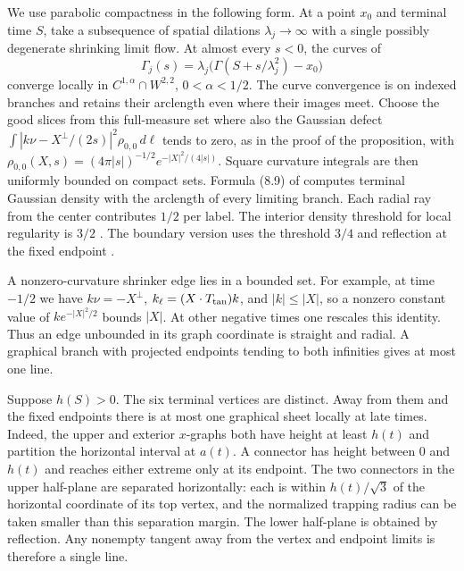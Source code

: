 We use parabolic compactness \cite[Definition~8.4 and
Proposition~8.17]{survey} in the following form. At a point \(x_0\)
and terminal time \(S\), take a subsequence of spatial dilations
\(\lambda_j\to\infty\) with a single possibly degenerate shrinking
limit flow. At almost every \(s<0\), the curves of
\[
 \Gamma_j(s)=\lambda_j\bigl(\Gamma(S+s/\lambda_j^2)-x_0\bigr)
\]
converge locally in \(C^{1,\alpha}\cap W^{2,2}\), \(0<\alpha<1/2\).
The curve convergence is on indexed branches and retains their arclength
even where their images meet. Choose the good slices from this full-measure
set where also the Gaussian defect
\(\int |k\nu-X^\perp/(2s)|^2\rho_{0,0}\,d\ell\) tends to zero, as in the
proof of the proposition, with
\(\rho_{0,0}(X,s)=(4\pi|s|)^{-1/2}e^{-|X|^2/(4|s|)}\).
Square curvature integrals are then uniformly
bounded on compact sets. Formula (8.9) of \cite{survey} computes terminal
Gaussian density with the arclength of every limiting branch. Each
radial ray from the center contributes \(1/2\) per label. The interior
density threshold for local regularity is \(3/2\)
\cite[Corollary~9.5]{survey}.
The boundary version uses the threshold \(3/4\) and reflection at the
fixed endpoint \cite[Corollary~9.6]{survey}.

A nonzero-curvature shrinker edge lies in a bounded set. For example,
at time \(-1/2\) we have \(k\nu=-X^\perp\),
\(k_\ell=(X\cdot T_{\rm tan})k\), and
\(|k|\le |X|\), so a nonzero constant value of \(k e^{-|X|^2/2}\)
bounds \(|X|\). At other negative times one rescales this identity.
Thus an edge unbounded in its graph coordinate is straight and
radial. A graphical branch with projected endpoints tending to both
infinities gives at most one line.

Suppose \(h(S)>0\). The six terminal vertices are distinct.
Away from them and the fixed endpoints there is at most one
graphical sheet locally at late times. Indeed, the upper and exterior
\(x\)-graphs both have height at least \(h(t)\) and partition the
horizontal interval at \(a(t)\). A connector has height between
\(0\) and \(h(t)\) and reaches either extreme only at its endpoint.
The two connectors in the upper half-plane are separated horizontally:
each is within \(h(t)/\sqrt3\) of the horizontal coordinate of its top
vertex, and the normalized trapping radius can be taken smaller than
this separation margin. The lower half-plane is obtained by reflection.
Any nonempty tangent away from the vertex and endpoint limits is
therefore a single line.


